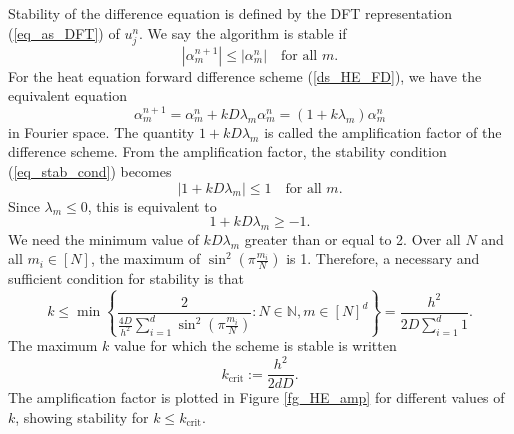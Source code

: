 \documentclass[12pt, reqno]{report}
\theoremstyle{definition}
\theoremstyle{remark}
\begin{document}
Stability of the difference equation is defined by the DFT representation (\ref{eq_as_DFT}) of $u_{j}^{n}$. We say the algorithm is stable if 
\begin{equation} \label{eq_stab_cond}
|\alpha_{m}^{n+1}|\le |\alpha_{m}^{n}|\quad \text{for all }m.
\end{equation}
For the heat equation forward difference scheme (\ref{ds_HE_FD}), we have the equivalent equation
\begin{equation} \label{ds_HE_FD_FT}
    \alpha_{m}^{n+1}=\alpha_{m}^{n}+k D\lambda_{m}\alpha_{m}^{n}=(1+k \lambda_{m})\alpha_{m}^{n}
\end{equation} 
in Fourier space.
The quantity $1+kD\lambda_m$ is called the amplification factor of the difference scheme. 
From the amplification factor, the stability condition (\ref{eq_stab_cond}) becomes 
\begin{equation}
    |1+k D\lambda_{m}|\le1\quad \text{for all }m.
\end{equation}
Since $\lambda_{m}\le 0$, this is equivalent to 
\begin{equation}
    1+k D\lambda_{m}\ge-1.
\end{equation}
We need the minimum value of $k D\lambda_{m}$ greater than or equal to 2. 
Over all $N$ and all $m_{i}\in[N]$, the maximum of $\sin^{2} \left(\pi \frac{m_i}{N}\right)$ is 1. 
Therefore, a necessary and sufficient condition for stability is that 
\begin{equation}
    k\le \min\left\{\frac{2}{\frac{4D}{h^{2}}\sum_{i=1}^{d}\sin^{2}\left(\pi \frac{m_{i}}{N}\right)}:N\in \mathbb{N},m\in[N]^{d}\right\}= \frac{h^{2}}{2D\sum_{i=1}^{d}1}.
\end{equation}
The maximum $k$ value for which the scheme is stable is written 
\begin{equation} %
k_\text{crit}:= \frac{h^{2}}{2dD}.
\end{equation}
The amplification factor is plotted in Figure \ref{fg_HE_amp} for different values of $k$, showing stability for $k\le k_\text{crit}$.
\end{document}
